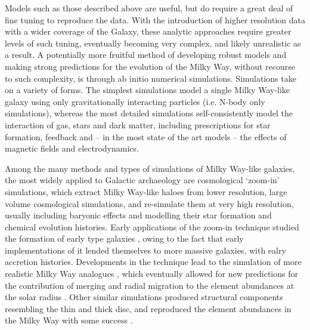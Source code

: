  Models such as those described above are useful, but do require a great deal of fine tuning to reproduce the data. With the introduction of higher resolution data with a wider coverage of the Galaxy, these analytic approaches require greater levels of such tuning, eventually becoming very complex, and likely unrealistic as a result. A potentially more fruitful method of developing robust models and making strong predictions for the evolution of the Milky Way, without recourse to such complexity, is through ab initio numerical simulations. Simulations take on a variety of forms. The simplest simulations model a single Milky Way-like galaxy using only gravitationally interacting particles (i.e. N-body only simulations),  whereas the most detailed simulations self-consistently model the interaction of gas, stars and dark matter, including prescriptions for star formation, feedback and -- in the most state of the art models -- the effects of magnetic fields and electrodynamics.
 
 Among the many methods and types of simulations of Milky Way-like galaxies, the most widely applied to Galactic archaeology are cosmological `zoom-in' simulations, which extract Milky Way-like haloes from lower resolution, large volume cosmological simulations, and re-simulate them at very high resolution, usually including baryonic effects and modelling their star formation and chemical evolution histories. Early applications of the zoom-in technique studied the formation of early type galaxies \citep[e.g.][]{1993ApJ...412..455K}, owing to the fact that early implementations of it lended themselves to more massive galaxies, with ealry accretion histories. Developments in the technique \citep[such as those described in][alongside those in the sub-grid models, as described earlier]{2009ApJ...707..250M} lead to the simulation of more realistic Milky Way analogues \citep[e.g.][]{2012ApJ...756...26M}, which eventually allowed for new predictions for the contribution of merging and radial migration to the element abundances at the solar radius \citep[e.g.][]{2013A&A...558A...9M,2014A&A...572A..92M}. Other similar simulations produced structural components resembling the thin and thick disc, and reproduced the element abundances in the Milky Way with some success \citep{2012MNRAS.426..690B}. 
 
